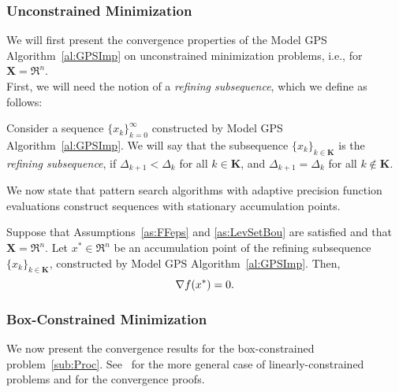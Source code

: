 \subsubsection{Unconstrained Minimization}

We will first present the convergence properties of the Model GPS
Algorithm~\ref{al:GPSImp} on unconstrained minimization problems, i.e., for 
$\mathbf X = \Re^n$.\\

First, we will need the notion of a {\em refining subsequence},
which we define as follows:
\begin{definition}
Consider a sequence $\{x_k\}_{k=0}^\infty$ constructed by Model GPS
Algorithm~\ref{al:GPSImp}.  We will say that the subsequence $\{ x_k \}_{k \in 
\mathbf K}$ is the {\em refining subsequence}, if $\Delta_{k+1} < 
\Delta_k$ for all $k \in \mathbf K$, and $\Delta_{k+1} = \Delta_k$
for all $k \notin \mathbf K$.
\rbox
\end{definition}

We now state that pattern search algorithms with adaptive precision
function evaluations construct sequences with stationary accumulation points.
\begin{theorem}
Suppose that Assumptions~\ref{as:FFeps} and \ref{as:LevSetBou} are
satisfied and that $\mathbf X = \Re^n$.
Let $x^* \in \Re^n$ be an accumulation point of the refining 
subsequence $\{ x_k \}_{k \in \mathbf K}$, constructed by Model GPS
Algorithm~\ref{al:GPSImp}. Then,
\begin{equation}
  \nabla f(x^*) = 0.
\lab{eq:GradConv}
\end{equation}
\rbox
\end{theorem}
\subsubsection{Box-Constrained Minimization}
We now present the convergence results for the box-constrained
problem~\eqref{sub:Proc}.
See~\cite{AudetDennis2003, PolakWetter2003:1, KoldaLewisTorczon2003:1}
for the more general case of linearly-constrained problems and for the convergence
proofs.\\

